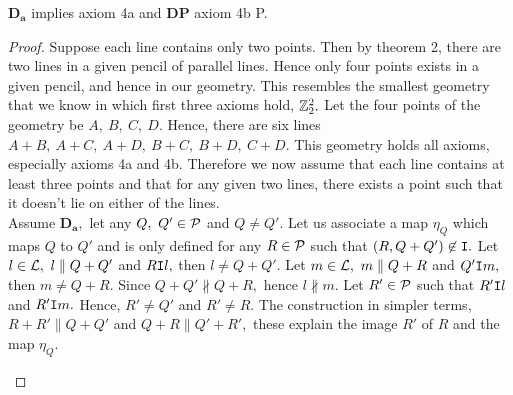 \begin{theorem}
    $\mathbf{D_a}$ implies axiom 4a and $\mathbf{DP}$ axiom 4b P. 
\end{theorem}

\begin{proof}
    Suppose each line contains only two points. Then by theorem 2, there are two lines in a given pencil of parallel lines. Hence only four points exists in a given pencil, and hence in our geometry. This resembles the smallest geometry that we know in which first three axioms hold, $\mathbb{Z}_2^2.$ Let the four points of the geometry be $A, \ B, \ C, \ D$. Hence, there are six lines $A+B, \ A+C, \ A + D, \ B+C, \ B+D, \ C +D$. This geometry holds all axioms, especially axioms 4a and 4b. Therefore we now assume that each line contains at least three points and that for any given two lines, there exists a point such that it doesn't lie on either of the lines. \\ 
    Assume $\mathbf{D_a},$ let any $Q, \ Q' \in \mathcal{P}$ and $Q \neq Q'.$ Let us associate a map $\eta_Q$ which maps $Q$ to $Q'$ and is only defined for any $R \in \mathcal{P}$ such that $(R,Q+Q') \not \in \texttt{I}.$ Let $l \in \mathcal{L}, \ l \parallel Q+Q'$ and $R\texttt{I} l,$ then $l \neq Q+Q'.$ Let $m \in \mathcal{L}, \ m \parallel Q+R$ and $Q' \texttt{I} m,$ then $m \neq Q+R.$ Since $Q+Q' \not \parallel Q+R,$ hence $l \not \parallel m.$ Let $R' \in \mathcal{P}$ such that $R' \texttt{I} l$ and $R' \texttt{I} m.$ Hence, $R' \neq Q'$ and $R' \neq R.$ The construction in simpler terms, $R+R' \parallel Q+Q'$ and $Q+R \parallel Q' + R',$ these explain the image $R'$ of $R$ and the map $\eta_Q.$

    \begin{center}
    \end{center}


\end{proof}
